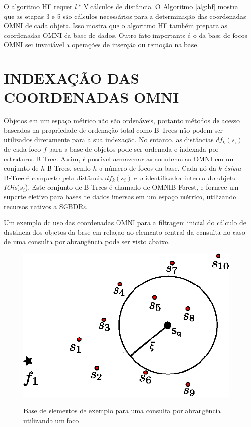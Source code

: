 O algoritmo HF requer $l*N$ cálculos de distância. O Algoritmo \ref{alg:hf} mostra que as etapas 3 e 5 são cálculos
necessários para a determinação das coordenadas OMNI de cada objeto. Isso mostra que o algoritmo HF também prepara as
coordenadas OMNI da base de dados. Outro fato importante é o da base de focos OMNI ser invariável a operações de inserção
ou remoção na base.

\section{INDEXAÇÃO DAS COORDENADAS OMNI}
\label{sec:indexomni}

Objetos em um espaço métrico não são ordenáveis, portanto métodos de acesso baseados na propriedade de ordenação total
como B-Trees não podem ser utilizados diretamente para a sua indexação. No entanto, as distâncias $df_k(s_i)$ de cada foco
$f$ para a base de objetos pode ser ordenada e indexada por estruturas B-Tree. Assim, é possível armazenar as coordenadas OMNI
em um conjunto de $h$ B-Trees, sendo $h$ o número de focos da base. Cada nó da \textit{k-ésima} B-Tree é composto pela distância $df_k(s_i)$
e o identificador interno do objeto \textit{IOid}($s_i$). Este conjunto de B-Trees é chamado de OMNIB-Forest, e fornece 
um suporte efetivo para bases de dados imersas em um espaço métrico, utilizando recursos nativos a SGBDRs.\par

Um exemplo do uso das coordenadas OMNI para a filtragem inicial do cálculo de distância dos objetos da base em relação ao elemento central da consulta no caso de uma consulta por
abrangência pode ser visto abaixo.

\begin{figure}[H]
\centering
\caption{Base de elementos de exemplo para uma consulta por abrangência utilizando um foco}
\includegraphics[width=.55\textwidth]{dados/figuras/rg_ex1.eps}
\label{fig:rgex1}
\end{figure}

